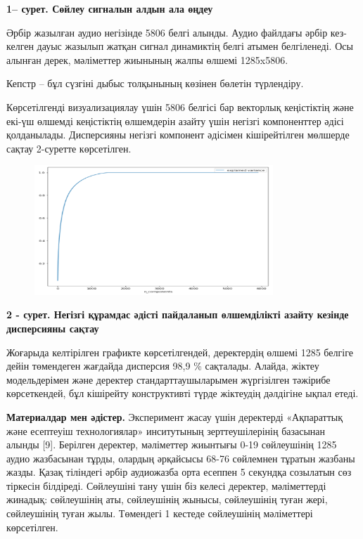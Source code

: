 {\bfseries 1-- сурет. Сөйлеу сигналын алдын ала өңдеу}

Әрбір жазылған аудио негізінде 5806 белгі алынды. Аудио файлдағы әрбір
кез-келген дауыс жазылып жатқан сигнал динамиктің белгі атымен
белгіленеді. Осы алынған дерек, мәліметтер жиынының жалпы өлшемі
1285x5806.

Кепстр -- бұл сүзгіні дыбыс толқынының көзінен бөлетін түрлендіру.

Көрсетілгенді визуализациялау үшін 5806 белгісі бар векторлық
кеңістіктің және екі-үш өлшемді кеңістіктің өлшемдерін азайту үшін
негізгі компоненттер әдісі қолданылады. Дисперсияны негізгі компонент
әдісімен кішірейтілген мөлшерде сақтау 2-суретте көрсетілген.

\begin{figure}[H]
	\centering
	\includegraphics[width=0.8\textwidth]{media/ict/image6}
	\caption*{}
\end{figure}


{\bfseries 2 - сурет. Негізгі құрамдас әдісті пайдаланып өлшемділікті
азайту кезінде дисперсияны сақтау}

Жоғарыда келтірілген графикте көрсетілгендей, деректердің өлшемі 1285
белгіге дейін төмендеген жағдайда дисперсия 98,9 \% сақталады. Алайда,
жіктеу модельдерімен және деректер стандарттаушыларымен жүргізілген
тәжірибе көрсеткендей, бұл кішірейту конструктивті түрде жіктеудің
дәлдігіне ықпал етеді.

{\bfseries Материалдар мен әдістер.} Эксперимент жасау үшін деректерді
«Ақпараттық және есептеуіш технологиялар» инситутының зерттеушілерінің
базасынан алынды {[}9{]}. Берілген деректер, мәліметтер жиынтығы 0-19
сөйлеушінің 1285 аудио жазбасынан тұрды, олардың әрқайсысы 68-76
сөйлемнен тұратын жазбаны жазды. Қазақ тіліндегі әрбір аудиожазба орта
есеппен 5 секундқа созылатын сөз тіркесін білдіреді. Сөйлеушіні тану
үшін біз келесі деректер, мәліметтерді жинадық: сөйлеушінің аты,
сөйлеушінің жынысы, сөйлеушінің туған жері, сөйлеушінің туған жылы.
Төмендегі 1 кестеде сөйлеушінің мәліметтері көрсетілген.

